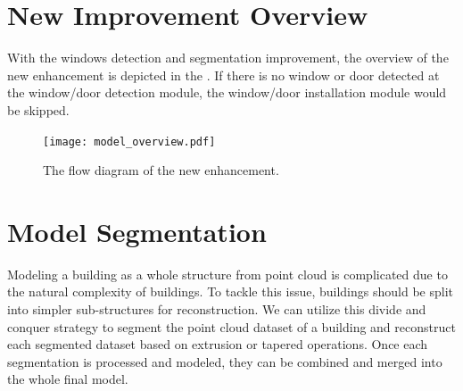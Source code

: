 

\section{New Improvement Overview}

With the windows detection and segmentation improvement, the overview of the new enhancement is depicted 
in the . If there is no window or door detected at the window/door detection module, 
the window/door installation module would be skipped.

\begin{figure}[htbp]
  \centering
  \texttt{[image: model\_overview.pdf]}
      \caption{The flow diagram of the new enhancement.}
      \label{fig:model_ov}
\end{figure}


\section{Model Segmentation}


Modeling a building as a whole structure from point cloud is complicated 
due to the natural complexity of buildings.
To tackle this issue, buildings should be split into simpler sub-structures for reconstruction.
We can utilize this divide and conquer strategy to segment the point cloud dataset of a building
and reconstruct each segmented dataset based on extrusion or tapered operations.
Once each segmentation is processed and modeled, they can be combined and merged into the whole final model.

